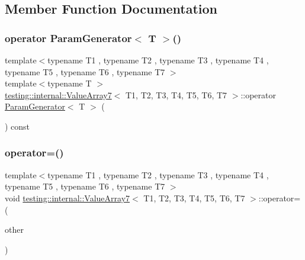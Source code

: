 \subsection{Member Function Documentation}
\mbox{\label{classtesting_1_1internal_1_1_value_array7_a4ab41f4a5687896e159c69f581d0a673}} 
\subsubsection{\texorpdfstring{operator ParamGenerator$<$ T $>$()}{operator ParamGenerator< T >()}}
{\footnotesize\ttfamily template$<$typename T1 , typename T2 , typename T3 , typename T4 , typename T5 , typename T6 , typename T7 $>$ \\
template$<$typename T $>$ \\
\mbox{\hyperlink{classtesting_1_1internal_1_1_value_array7}{testing\+::internal\+::\+Value\+Array7}}$<$ T1, T2, T3, T4, T5, T6, T7 $>$\+::operator \mbox{\hyperlink{classtesting_1_1internal_1_1_param_generator}{Param\+Generator}}$<$ T $>$ (\begin{DoxyParamCaption}{ }\end{DoxyParamCaption}) const\hspace{0.3cm}{\ttfamily [inline]}}

\mbox{\label{classtesting_1_1internal_1_1_value_array7_a24ff5b03981b3008a0f1af33161925ec}} 
\subsubsection{\texorpdfstring{operator=()}{operator=()}}
{\footnotesize\ttfamily template$<$typename T1 , typename T2 , typename T3 , typename T4 , typename T5 , typename T6 , typename T7 $>$ \\
void \mbox{\hyperlink{classtesting_1_1internal_1_1_value_array7}{testing\+::internal\+::\+Value\+Array7}}$<$ T1, T2, T3, T4, T5, T6, T7 $>$\+::operator= (\begin{DoxyParamCaption}\item[{const \mbox{\hyperlink{classtesting_1_1internal_1_1_value_array7}{Value\+Array7}}$<$ T1, T2, T3, T4, T5, T6, T7 $>$ \&}]{other }\end{DoxyParamCaption})\hspace{0.3cm}{\ttfamily [private]}}



